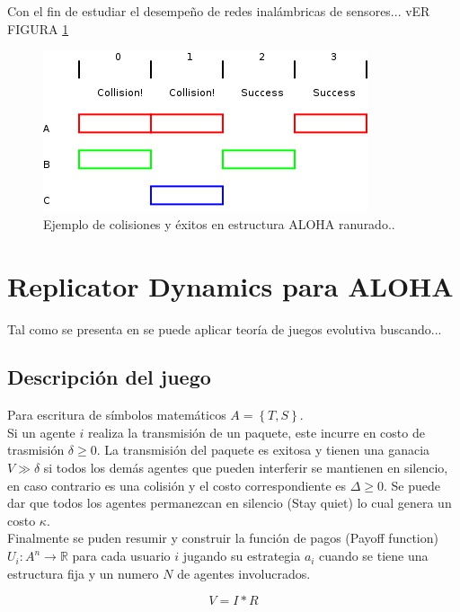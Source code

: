 \documentclass[journal]{IEEEtran}
\begin{document}
Con el fin de estudiar el desempeño de redes inalámbricas de sensores... vER FIGURA \ref{fig:slottedaloha}


\begin{figure}
\begin{center}
\includegraphics[scale=0.7]{slottedaloha.jpg}
\caption{Ejemplo de colisiones y éxitos en estructura ALOHA ranurado.\cite{ pagaloha2}.}
\label{fig:slottedaloha}
\end{center}
\end{figure}

\section{Replicator Dynamics para ALOHA}

Tal como se presenta en \cite{Mprincipal} se puede aplicar teoría de juegos evolutiva buscando...

\subsection{Descripción del juego}

Para escritura de símbolos matemáticos $A=  \left\lbrace T, S \right\rbrace$. \\
Si un agente $i$ realiza la transmisión de un paquete, este incurre en costo de trasmisión $\delta \geq 0$. La transmisión del paquete es exitosa y tienen una ganacia $V \gg \delta $ si todos los demás agentes que pueden interferir se mantienen en silencio, en caso contrario es una colisión y el costo correspondiente es $\Delta \geq 0$. Se puede dar que todos los agentes permanezcan en silencio (Stay quiet) lo cual genera un costo $\kappa$.\\ Finalmente se puden resumir y construir la función de pagos (Payoff function) $U_i : A^n \rightarrow  \mathbb{R} $ para cada usuario $i$ jugando su estrategia $a_i$ cuando se tiene una estructura fija y un numero $N$ de agentes involucrados\cite{Mprincipal}.

\begin{equation}
V=I*R
\end{equation}
\end{document}
